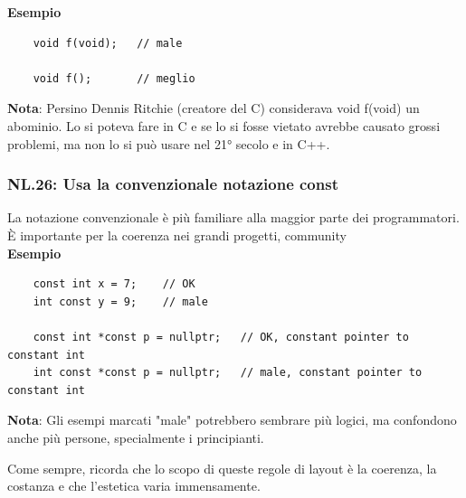 \textsf{\small \textbf{Esempio}}

\begin{lstlisting}
	void f(void);   // male
	
	void f();       // meglio
\end{lstlisting}

\textsf{\small \textbf{Nota}: Persino Dennis Ritchie (creatore del C) considerava void f(void) un abominio. Lo si poteva fare in C e se lo si fosse vietato avrebbe causato grossi problemi, ma non lo si può usare nel 21° secolo e in C++. } \\

\subsubsection{NL.26: Usa la convenzionale notazione const}

\textsf{\small La notazione convenzionale è più familiare alla maggior parte dei programmatori. È importante per la coerenza nei grandi progetti, community} \\

\textsf{\small \textbf{Esempio}}

\begin{lstlisting}
	const int x = 7;    // OK
	int const y = 9;    // male
	
	const int *const p = nullptr;   // OK, constant pointer to constant int
	int const *const p = nullptr;   // male, constant pointer to constant int
\end{lstlisting}

\textsf{\small \textbf{Nota}: Gli esempi marcati "male" potrebbero sembrare più logici, ma confondono anche più persone, specialmente i principianti.} \break

\textsf{\small Come sempre, ricorda che lo scopo di queste regole di layout è la coerenza, la costanza e che l'estetica varia immensamente.} \\


